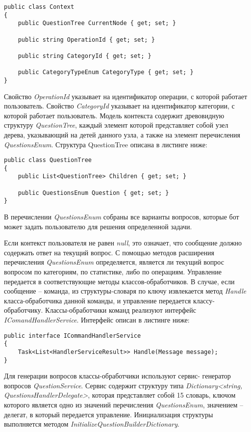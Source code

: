 \lstset{style=sharpc}
\begin{lstlisting}
public class Context
{
	public QuestionTree CurrentNode { get; set; }

	public string OperationId { get; set; }

	public string CategoryId { get; set; }

	public CategoryTypeEnum CategoryType { get; set; }
}
\end{lstlisting}

Свойство \emph{OperationId} указывает на идентификатор операции, с которой работает пользователь.
Свойство \emph{CategoryId} указывает на идентификатор категории, с которой работает пользователь.
Модель контекста содержит древовидную структуру \emph{QuestionTree}, каждый элемент которой представляет собой узел дерева, указывающий на детей данного узла, а также на элемент перечисления \emph{QuestionsEnum}. Структура QuestionTree описана в листинге ниже:

\lstset{style=sharpc}
\begin{lstlisting}
public class QuestionTree
{
	public List<QuestionTree> Children { get; set; }

	public QuestionsEnum Question { get; set; }
}
\end{lstlisting}

В перечислении \emph{QuestionsEnum} собраны все варианты вопросов, которые бот может задать пользователю для решения определенной задачи.

Если контекст пользователя не равен \emph{null}, это означает, что сообщение должно содержать ответ на текущий вопрос. С помощью методов расширения перечисления \emph{QuestionsEnum} определяется, является ли текущий вопрос вопросом по категориям, по статистике, либо по операциям. Управление передается в соответствующие методы классов-обработчиков.
В случае, если сообщение – команда, из структуры-словаря по ключу извлекается метод \emph{Handle} класса-обработчика данной команды, и управление передается классу-обработчику.
Классы-обработчики команд реализуют интерфейс \emph{IComandHandlerService}. Интерфейс описан в листинге ниже:

\lstset{style=sharpc}
\begin{lstlisting}
public interface ICommandHandlerService
{
	Task<List<HandlerServiceResult>> Handle(Message message);
}
\end{lstlisting}

Для генерации вопросов классы-обработчики используют сервис- \linebreak генератор вопросов \emph{QuestionService}. Сервис содержит структуру типа \linebreak \emph{Dictionary<string, QuestionsHandlerDelegate>}, которая представляет собой
15
словарь, ключом которого является одно из значений перечисления \linebreak \emph{QuestionsEnum}, значением – делегат, в который передается управление.
Инициализация структуры выполняется методом \linebreak \emph{InitializeQuestionBuilderDictionary}.

